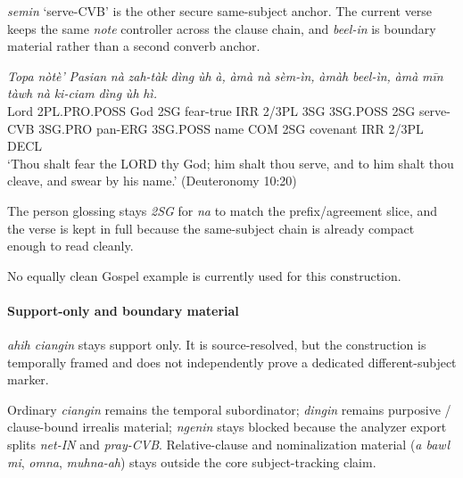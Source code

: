 \documentclass[
  11pt,
  a4paper,
]{article}
\newcommand{\tdim}[1]{\textit{#1}}
\newcommand{\tdimword}[1]{\textit{#1}}
\renewcommand{\textsc}[1]{{\footnotesize\MakeUppercase{#1}}}
\newcommand{\glossquote}[1]{`#1'}
\begin{document}
\tdim{semin} \glossquote{serve-CVB} is the other secure same-subject
anchor. The current verse keeps the same \tdim{note} controller across
the clause chain, and \tdim{beel-in} is boundary material rather than a
second converb anchor.

\begin{exe}
\ex \label{ex:sr-semin-deut10p20}
\gll \tdimword{Topa} \tdimword{nòtè'} \tdimword{Pasian} \tdimword{nà} \tdimword{zah-tàk} \tdimword{dìng} \tdimword{ùh} \tdimword{à,} \tdimword{àmà} \tdimword{nà} \tdimword{sèm-ìn,} \tdimword{àmàh} \tdimword{beel-ìn,} \tdimword{àmà} \tdimword{mīn} \tdimword{tàwh} \tdimword{nà} \tdimword{ki-ciam} \tdimword{dìng} \tdimword{ùh} \tdimword{hì.} \\
     Lord \textsc{2pl}.\textsc{pro}.\textsc{poss} God \textsc{2sg} fear-true \textsc{irr} 2/3PL \textsc{3sg} \textsc{3sg}.\textsc{poss} \textsc{2sg} serve-\textsc{cvb} \textsc{3sg}.\textsc{pro} pan-\textsc{erg} \textsc{3sg}.\textsc{poss} name \textsc{com} \textsc{2sg} covenant \textsc{irr} 2/3PL \textsc{decl} \\
\glt \glossquote{Thou shalt fear the LORD thy God; him shalt thou serve, and to him shalt thou cleave, and swear by his name.} (Deuteronomy 10:20)
\end{exe}

The person glossing stays \tdim{2SG} for \tdim{na} to match the
prefix/agreement slice, and the verse is kept in full because the
same-subject chain is already compact enough to read cleanly.

No equally clean Gospel example is currently used for this construction.

\paragraph{Support-only and boundary
material}\label{support-only-and-boundary-material}

\tdim{ahih ciangin} stays support only. It is source-resolved, but the
construction is temporally framed and does not independently prove a
dedicated different-subject marker.

Ordinary \tdim{ciangin} remains the temporal subordinator; \tdim{dingin}
remains purposive / clause-bound irrealis material; \tdim{ngenin} stays
blocked because the analyzer export splits \tdim{net-IN} and
\tdim{pray-CVB}. Relative-clause and nominalization material
(\tdim{a bawl mi}, \tdim{omna}, \tdim{muhna-ah}) stays outside the core
subject-tracking claim.
\end{document}
